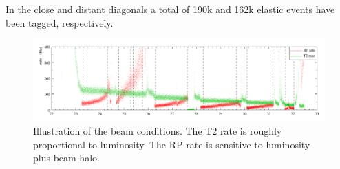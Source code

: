 In the close and distant diagonals a total of 190k and 162k elastic events have
been tagged, respectively.


\begin{figure}
\begin{center}
\includegraphics[width=16cm]{fig/overview.pdf}
\vskip-3mm
\caption{%
Illustration of the beam conditions. The T2 rate is roughly proportional to luminosity. The RP rate is sensitive to luminosity plus beam-halo.
}
\label{fig:overview}
\end{center}
\end{figure}
